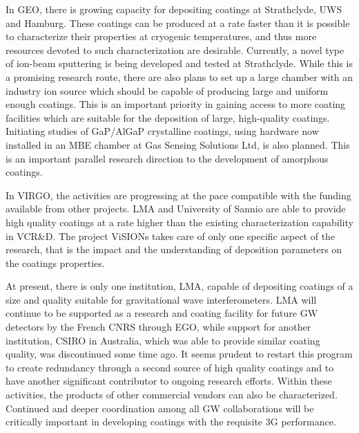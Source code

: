 In GEO, there is growing capacity for depositing coatings at Strathclyde, UWS and Hamburg. These coatings can be produced at a rate faster than it is possible to characterize their properties at cryogenic temperatures, and thus more resources devoted to such characterization are desirable. Currently, a novel type of ion-beam sputtering is being developed and tested at Strathclyde. While this is a promising research route, there are also plans to set up a large chamber with an industry ion source which should be capable of producing large and uniform enough coatings. This is an important priority in gaining access to more coating facilities which are suitable for the deposition of large, high-quality coatings. Initiating studies of GaP/AlGaP crystalline coatings, using hardware now installed in an MBE chamber at Gas Sensing Solutions Ltd, is also planned. This is an important parallel research direction to the development of amorphous coatings.

In VIRGO, the activities are progressing at the pace compatible with the funding available from other projects.  LMA and University of Sannio are able to provide high quality coatings at a rate higher than the existing characterization capability in VCR\&D. The project ViSIONs takes care of only one specific aspect of the research, that is the impact and the understanding of deposition parameters on the coatings properties.

At present, there is only one institution, LMA, capable of depositing coatings of a size and quality suitable for gravitational wave interferometers. LMA will continue to be supported as a research and coating facility for future GW detectors by the French CNRS through EGO, while support for another institution, CSIRO in Australia, which was able to provide similar coating quality, was discontinued some time ago. It seems prudent to restart this program to create redundancy through a second source of high quality coatings and to have another significant contributor to ongoing research efforts. Within these activities, the products of other commercial vendors can also be characterized. 
Continued and deeper coordination among all GW collaborations will be critically important in developing coatings with the requisite 3G performance.


